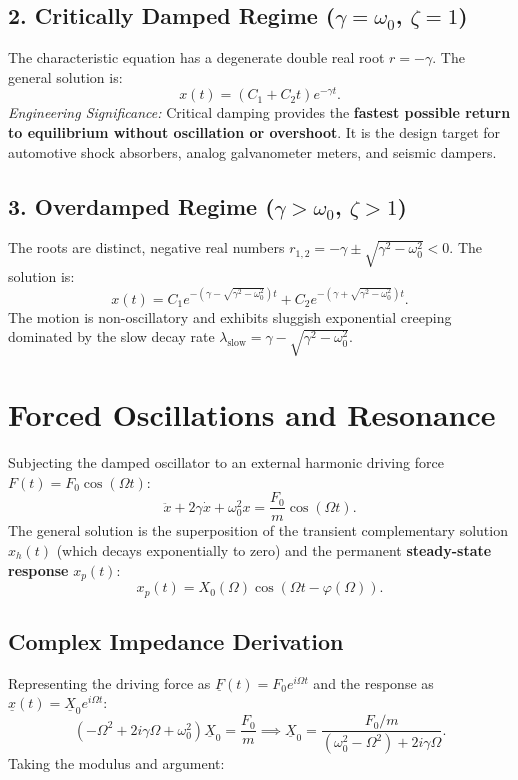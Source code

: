 \subsection{2. Critically Damped Regime ($\gamma = \omega_0$, $\zeta = 1$)}
The characteristic equation has a degenerate double real root $r = -\gamma$. The general solution is:
\begin{equation}
x(t) = (C_1 + C_2 t) e^{-\gamma t}.
\end{equation}
\emph{Engineering Significance:} Critical damping provides the \textbf{fastest possible return to equilibrium without oscillation or overshoot}. It is the design target for automotive shock absorbers, analog galvanometer meters, and seismic dampers.

\subsection{3. Overdamped Regime ($\gamma > \omega_0$, $\zeta > 1$)}
The roots are distinct, negative real numbers $r_{1,2} = -\gamma \pm \sqrt{\gamma^2 - \omega_0^2} < 0$. The solution is:
\begin{equation}
x(t) = C_1 e^{-(\gamma - \sqrt{\gamma^2 - \omega_0^2})t} + C_2 e^{-(\gamma + \sqrt{\gamma^2 - \omega_0^2})t}.
\end{equation}
The motion is non-oscillatory and exhibits sluggish exponential creeping dominated by the slow decay rate $\lambda_{\text{slow}} = \gamma - \sqrt{\gamma^2 - \omega_0^2}$.

\section{Forced Oscillations and Resonance}

Subjecting the damped oscillator to an external harmonic driving force $F(t) = F_0 \cos(\Omega t)$:
\begin{equation}
\ddot{x} + 2\gamma \dot{x} + \omega_0^2 x = \frac{F_0}{m} \cos(\Omega t).
\end{equation}
The general solution is the superposition of the transient complementary solution $x_h(t)$ (which decays exponentially to zero) and the permanent \textbf{steady-state response} $x_p(t)$:
\begin{equation}
x_p(t) = X_0(\Omega) \cos(\Omega t - \varphi(\Omega)).
\end{equation}

\subsection{Complex Impedance Derivation}
Representing the driving force as $\underline{F}(t) = F_0 e^{i\Omega t}$ and the response as $\underline{x}(t) = \underline{X}_0 e^{i\Omega t}$:
\[
(-\Omega^2 + 2i\gamma\Omega + \omega_0^2) \underline{X}_0 = \frac{F_0}{m} \implies \underline{X}_0 = \frac{F_0 / m}{(\omega_0^2 - \Omega^2) + 2i\gamma\Omega}.
\]
Taking the modulus and argument:

